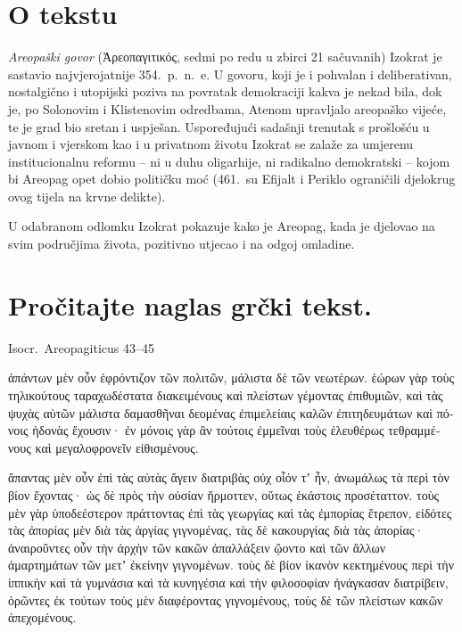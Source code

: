 


\section*{O tekstu}

\textit{Areopaški govor} (Ἀρεοπαγιτικός, sedmi po redu u zbirci 21 sačuvanih) Izokrat je sastavio najvjerojatnije 354.\ p.~n.~e. U govoru, koji je i pohvalan i deliberativan, nostalgično i utopijski poziva na povratak demokraciji kakva je nekad bila, dok je, po Solonovim i Klistenovim odredbama, Atenom upravljalo areopaško vijeće, te je grad bio sretan i uspješan. Uspoređujući sadašnji trenutak s prošlošću u javnom i vjerskom kao i u privatnom životu Izokrat se zalaže za umjerenu institucionalnu reformu – ni u duhu oligarhije, ni radikalno demokratski – kojom bi Areopag opet dobio političku moć (461.\ su Efijalt i Periklo ograničili djelokrug ovog tijela na krvne delikte).

U odabranom odlomku Izokrat pokazuje kako je Areopag, kada je djelovao na svim područjima života, pozitivno utjecao i na odgoj omladine.


\section*{Pročitajte naglas grčki tekst.}

Isocr.\ Areopagiticus 43–45


\medskip


{\large

\begin{greek}

\noindent  ἁπάντων μὲν οὖν ἐφρόντιζον τῶν πολιτῶν, μάλιστα δὲ τῶν νεωτέρων. ἑώρων γὰρ τοὺς τηλικούτους ταραχωδέστατα διακειμένους καὶ πλείστων γέμοντας ἐπιθυμιῶν, καὶ τὰς ψυχὰς αὐτῶν μάλιστα δαμασθῆναι δεομένας ἐπιμελείαις καλῶν ἐπιτηδευμάτων καὶ πόνοις ἡδονὰς ἔχουσιν· ἐν μόνοις γὰρ ἂν τούτοις ἐμμεῖναι τοὺς ἐλευθέρως τεθραμμένους καὶ μεγαλοφρονεῖν εἰθισμένους.

\noindent  ἅπαντας μὲν οὖν ἐπὶ τὰς αὐτὰς ἄγειν διατριβὰς οὐχ οἷόν τʼ ἦν, ἀνωμάλως τὰ περὶ τὸν βίον ἔχοντας· ὡς δὲ πρὸς τὴν οὐσίαν ἥρμοττεν, οὕτως ἑκάστοις προσέταττον. τοὺς μὲν γὰρ ὑποδεέστερον πράττοντας ἐπὶ τὰς γεωργίας καὶ τὰς ἐμπορίας ἔτρεπον, εἰδότες τὰς ἀπορίας μὲν διὰ τὰς ἀργίας γιγνομένας, τὰς δὲ κακουργίας διὰ τὰς ἀπορίας· ἀναιροῦντες οὖν τὴν ἀρχὴν τῶν κακῶν ἀπαλλάξειν ᾤοντο καὶ τῶν ἄλλων ἁμαρτημάτων τῶν μετʼ ἐκείνην γιγνομένων. τοὺς δὲ βίον ἱκανὸν κεκτημένους περὶ τὴν ἱππικὴν καὶ τὰ γυμνάσια καὶ τὰ κυνηγέσια καὶ τὴν φιλοσοφίαν ἠνάγκασαν διατρίβειν, ὁρῶντες ἐκ τούτων τοὺς μὲν διαφέροντας γιγνομένους, τοὺς δὲ τῶν πλείστων κακῶν ἀπεχομένους.
\end{greek}

}

